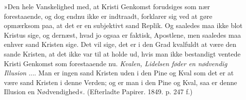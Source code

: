 \documentclass[12pt,a4paper,openany]{book}
\newcommand{\opage}[1]{\marginnote{\footnotesize\textit{[#1]}}}
\begin{document}
»Den hele Vanskelighed med, at Kristi Genkomst
forudsiges som nær forestaaende, og dog endnu ikke er
indtraadt, forklarer sig ved at gøre opmærksom paa, at
det er en subjektivt sand Replik. Og saaledes maa ikke
blot Kristus sige, og dernæst, hvad jo ogsaa er faktisk,
Apostlene, men saaledes maa enhver sand Kristen sige.
Det vil sige, det er i den Grad kvalfuldt at være den
sande Kristen, at det ikke var til at holde ud, hvis man
ikke bestandigt ventede Kristi Genkomst som forestaaende
\opage{154}nu. \textit{Kvalen, Lidelsen føder en nødvendig Illusion} ....
Man er ingen sand Kristen uden i den Pine og Kval
som det er at være sand Kristen i denne Verden; og er
man i den Pine og Kval, saa er denne Illusion en Nødvendighed«.
(Efterladte Papirer. 1849. p. 247 f.)
\end{document}
